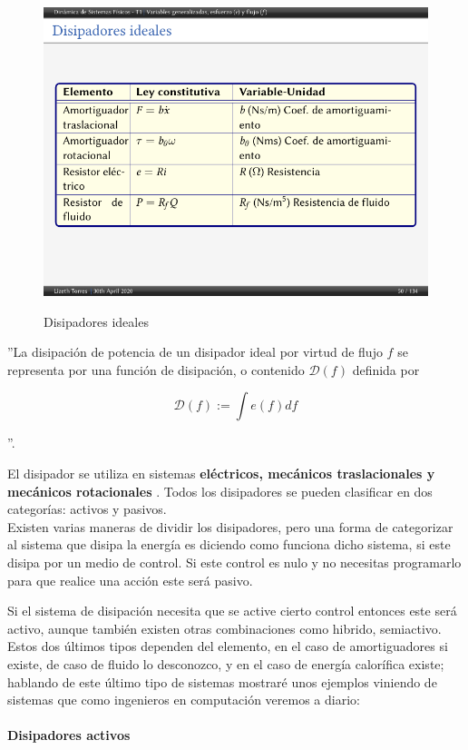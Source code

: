 \begin{figure}[H]
	\centering
	\caption{Disipadores ideales \cite{w1}}
	\includegraphics[width=0.7\linewidth]{latex/tabla3}
	\label{fig:tabla3}
\end{figure}

''La disipación de potencia de un disipador ideal por virtud de flujo $ f  $ se
representa por una función de disipación, o contenido $ \mathcal{D}(f) $ definida por

\begin{equation*}
	\mathcal{D}(f):=\int e(f) d f
\end{equation*}	

''\cite{w1}.

El disipador se utiliza en sistemas \textbf{eléctricos, mecánicos traslacionales y mecánicos rotacionales}	. Todos los disipadores se pueden clasificar en dos categorías: activos y pasivos.\\



Existen varias maneras de dividir los disipadores, pero una forma de categorizar al sistema que disipa la energía es diciendo como funciona dicho sistema, si este disipa por un medio de control. Si este control es nulo y no necesitas programarlo para que realice una acción este será pasivo.

Si el sistema de disipación necesita que se active cierto control entonces este será activo, aunque también existen otras combinaciones como hibrido, semiactivo. Estos dos últimos tipos dependen del elemento, en el caso de amortiguadores si existe, de caso de fluido lo desconozco, y en el caso de energía calorífica existe; hablando de este último tipo de sistemas mostraré unos ejemplos viniendo de sistemas que como ingenieros en computación veremos a diario:

\paragraph{Disipadores activos}

